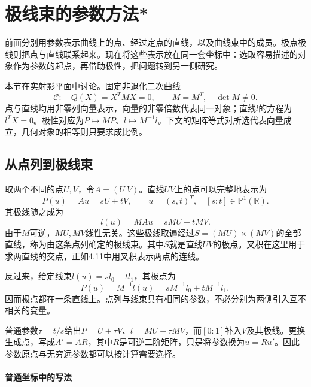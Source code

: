 \newpage
\section{极线束的参数方法*}
\label{sec:quadratic-polar-pencil-method}

前面分别用参数表示曲线上的点、经过定点的直线，以及曲线束中的成员。极点极线则把点与直线联系起来。现在将这些表示放在同一套坐标中：选取容易描述的对象作为参数的起点，再借助极性，把问题转到另一侧研究。

本节在实射影平面中讨论。固定非退化二次曲线
\begin{equation*}
 \mathcal C:\quad Q(X)=X^TMX=0,\qquad M=M^T,\quad\det M\ne0.
\end{equation*}
点与直线均用非零列向量表示，向量的非零倍数代表同一对象；直线\(l\)的方程为\(l^TX=0\)。极性对应为\(P\mapsto MP\)、\(l\mapsto M^{-1}l\)。下文的矩阵等式对所选代表向量成立，几何对象的相等则只要求成比例。

\subsection{从点列到极线束}
\label{subsec:quadratic-polar-pencil-parameters}

取两个不同的点\(U,V\)，令\(A=(U\ V)\)。直线\(UV\)上的点可以完整地表示为
\begin{equation}\label{eq:quadratic-polar-pencil-point}
 P(u)=Au=sU+tV,\qquad u=(s,t)^T,\quad[s:t]\in\mathbb P^1(\mathbb R).
\end{equation}
其极线随之成为
\begin{equation}\label{eq:quadratic-polar-pencil-line}
 l(u)=MAu=sMU+tMV.
\end{equation}
由于\(M\)可逆，\(MU,MV\)线性无关。这些极线取遍经过\(S=(MU)\times(MV)\)的全部直线，称为由这条点列确定的{\heiti{}极线束}。其中\(S\)就是直线\(UV\)的极点。叉积在这里用于求两直线的交点，正如4.11中用叉积表示两点的连线。

反过来，给定线束\(l(u)=sl_0+tl_1\)，其极点为
\begin{equation*}
 P(u)=M^{-1}l(u)=sM^{-1}l_0+tM^{-1}l_1,
\end{equation*}
因而极点都在一条直线上。点列与线束具有相同的参数，不必分别为两侧引入互不相关的变量。

普通参数\(\tau=t/s\)给出\(P=U+\tau V\)、\(l=MU+\tau MV\)，而\([0:1]\)补入\(V\)及其极线。更换生成点，写成\(A'=AR\)，其中\(R\)是可逆二阶矩阵，只是将参数换为\(u=Ru'\)。因此参数原点与无穷远参数都可以按计算需要选择。

\paragraph{普通坐标中的写法} \mbox{}\par\nopagebreak[4]

